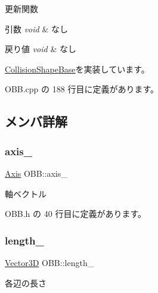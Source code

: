 更新関数 


\begin{DoxyParams}{引数}
{\em void} & なし \\
\hline
\end{DoxyParams}

\begin{DoxyRetVals}{戻り値}
{\em void} & なし \\
\hline
\end{DoxyRetVals}


\mbox{\hyperlink{class_collision_shape_base_a7aaa0f4de4e208f168f78e3445313929}{Collision\+Shape\+Base}}を実装しています。



 O\+B\+B.\+cpp の 188 行目に定義があります。



\subsection{メンバ詳解}
\mbox{\label{class_o_b_b_ab8d2349b189dd942a55e49a61fc10809}} 
\subsubsection{\texorpdfstring{axis\+\_\+}{axis\_}}
{\footnotesize\ttfamily \mbox{\hyperlink{class_axis}{Axis}} O\+B\+B\+::axis\+\_\+\hspace{0.3cm}{\ttfamily [private]}}



軸ベクトル 



 O\+B\+B.\+h の 40 行目に定義があります。

\mbox{\label{class_o_b_b_a04dc4d7036d26215f9c33a7cad633947}} 
\subsubsection{\texorpdfstring{length\+\_\+}{length\_}}
{\footnotesize\ttfamily \mbox{\hyperlink{class_vector3_d}{Vector3D}} O\+B\+B\+::length\+\_\+\hspace{0.3cm}{\ttfamily [private]}}



各辺の長さ 



